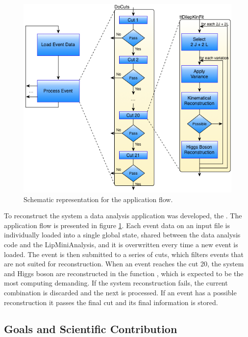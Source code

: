 \begin{figure}[!htp]
	\begin{center}
		\includegraphics[scale=0.5]{imgs/graf_abstract_flow_with_kinfit.png}
		\caption{Schematic representation for the \tth application flow.}
		\label{fig:flow}
	\end{center}
\end{figure}

To reconstruct the \ttH system a data analysis application was developed, the \tth. The application flow is presented in figure \ref{fig:flow}. Each event data on an input file is individually loaded into a single global state, shared between the data analysis code and the LipMiniAnalysis, and it is overwritten every time a new event is loaded. The event is then submitted to a series of cuts, which filters events that are not suited for reconstruction. When an event reaches the cut 20, the \ttbar system and Higgs boson are reconstructed in the function \ttDilepKinFit, which is expected to be the most computing demanding. If the \ttbar system reconstruction fails, the current combination is discarded and the next is processed. If an event has a possible reconstruction it passes the final cut and its final information is stored.

\subsection{Goals and Scientific Contribution}
\label{goals}



